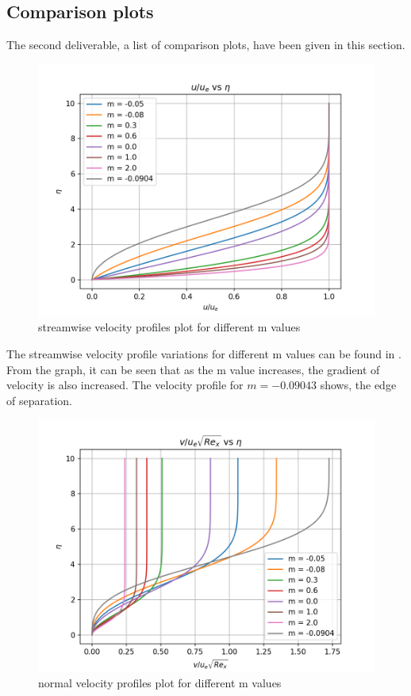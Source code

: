 \subsection{Comparison plots}
\par The second deliverable, a list of comparison plots, have been given in
this section. \\
\begin{figure}[!h]
    \centering
    \includegraphics[scale=0.5]{supporting_documents/02_question_2_and_3_codeDevelopment/03_postProcessing/plot_1.png}
    \caption{streamwise velocity profiles plot for different m values}
    \label{plot_1}
\end{figure}

\par The streamwise velocity profile variations for different m values can
be found in . From the graph, it can be seen that as the
m value increases, the gradient of velocity is also increased. The velocity
profile for $m = -0.09043$ shows, the edge of separation.


\begin{figure}[!h]
   \centering
    \includegraphics[scale=0.5]{supporting_documents/02_question_2_and_3_codeDevelopment/03_postProcessing/plot_2.png}
    \caption{normal velocity profiles plot for different m values}
    \label{plot_2}
\end{figure}

